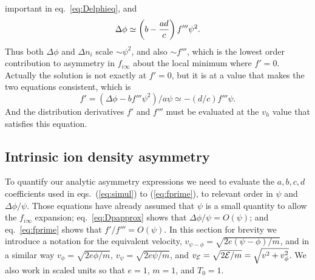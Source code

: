 \documentclass[12pt]{article}
\def\energy{{\cal E}}
\begin{document}
important in eq.\ \ref{eq:Delphieq}, and
\begin{equation}
  \label{eq:Dpapprox}
  \Delta\phi
\simeq
  \left(b-{ad\over c}\right)f'''\psi^2.
\end{equation}
Thus both $\Delta\phi$ and $\Delta n_i$ scale $\sim \psi^2$, and also
$\sim f'''$, which is the lowest order contribution to asymmetry in
$f_{i\infty}$ about the local minimum where $f'=0$. Actually the
solution is not exactly at $f'=0$, but it is at a value that makes the
two equations consistent, which is
\begin{equation}
  \label{eq:fprime}
  f'=(\Delta\phi - bf'''\psi^2)/a\psi \simeq
 -(d/c) f'''\psi.
\end{equation}
And the distribution derivatives $f'$ and $f'''$ must be evaluated at
the $v_h$ value that satisfies this equation.

\subsection{Intrinsic ion density asymmetry}


To quantify our analytic asymmetry expressions we need to evaluate the
$a,b,c,d$ coefficients used in eqs.\ (\ref{eq:simul}) to
(\ref{eq:fprime}), to relevant order in $\psi$ and $\Delta\phi/\psi$.
Those equations have already assumed that $\psi$ is a small quantity
to allow the $f_{i\infty}$ expansion; eq.\ \ref{eq:Dpapprox} shows
that $\Delta\phi/\psi=O(\psi)$; and eq.\ \ref{eq:fprime} shows that
$f'/f'''= O(\psi)$. In this section for brevity we introduce a
notation for the equivalent velocity,
$v_{\psi-\phi}=\sqrt{2e(\psi-\phi)/m}$, and in a similar way
$v_\phi=\sqrt{2e\phi/m}$, $v_\psi=\sqrt{2e\psi/m}$, and
$v_\energy=\sqrt{2\energy/m}=\sqrt{v^2+v_\phi^2}$. We also work in
scaled units so that $e=1$, $m=1$, and $T_0=1$.
\end{document}
